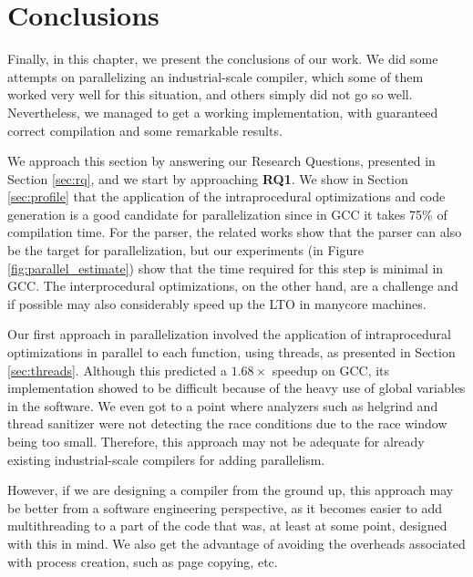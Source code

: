 \chapter{Conclusions}
\label{chap:conclusions}

Finally, in this chapter, we present the conclusions of our work. We did some
attempts on parallelizing an industrial-scale compiler, which some of them
worked very well for this situation, and others simply did not go so well.
Nevertheless, we managed to get a working implementation, with guaranteed
correct compilation and some remarkable results.

We approach this section by answering our Research Questions, presented in
Section \ref{sec:rq}, and we start by approaching \textbf{RQ1}. We show in
Section \ref{sec:profile} that the application of the intraprocedural
optimizations and code generation is a good candidate for parallelization since
in GCC it takes 75\% of compilation time.  For the parser, the related works
show that the parser can also be the target for parallelization, but our
experiments (in Figure \ref{fig:parallel_estimate}) show that the time required
for this step is minimal in GCC. The interprocedural optimizations, on the
other hand, are a challenge and if possible may also considerably speed up the
LTO in manycore machines. 


Our first approach in parallelization involved the application of intraprocedural
optimizations in parallel to each function, using threads, as presented in
Section \ref{sec:threads}. Although this
predicted a $1.68\times$ speedup on GCC, its implementation showed to be
difficult because of the heavy use of global variables in the software.  We
even got to a point where analyzers such as helgrind and thread sanitizer were
not detecting the race conditions due to the race window being too small.
Therefore, this approach may not be adequate for already existing
industrial-scale compilers for adding parallelism.

However, if we are designing a compiler from the ground up, this approach may
be better from a software engineering perspective, as it becomes easier to add
multithreading to a part of the code that was, at least at some point, designed
with this in mind. We also get the advantage of avoiding the overheads
associated with process creation, such as page copying, etc.

